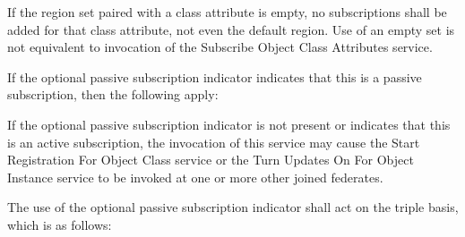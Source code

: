 \begin{compactstdpage}

    If the region set paired with a class attribute is empty, no subscriptions shall be added for that class attribute, not even the default region. Use of an empty set is not equivalent to invocation of the Subscribe Object Class Attributes service.

    If the optional passive subscription indicator indicates that this is a passive subscription, then the following apply:

    If the optional passive subscription indicator is not present or indicates that this is an active subscription, the invocation of this service may cause the Start Registration For Object Class \rtiinitiated{} service or the Turn Updates On For Object Instance \rtiinitiated{} service to be invoked at one or more other joined federates.

    The use of the optional passive subscription indicator shall act on the triple basis, which is as follows:


\end{compactstdpage}
